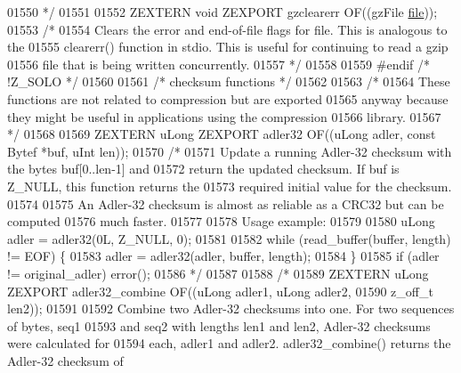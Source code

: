 \begin{DoxyCode}
01550 \textcolor{comment}{*/}
01551 
01552 ZEXTERN \textcolor{keywordtype}{void} ZEXPORT gzclearerr OF((gzFile \hyperlink{structfile}{file}));
01553 \textcolor{comment}{/*}
01554 \textcolor{comment}{     Clears the error and end-of-file flags for file.  This is analogous to the}
01555 \textcolor{comment}{   clearerr() function in stdio.  This is useful for continuing to read a gzip}
01556 \textcolor{comment}{   file that is being written concurrently.}
01557 \textcolor{comment}{*/}
01558 
01559 \textcolor{preprocessor}{#endif }\textcolor{comment}{/* !Z\_SOLO */}\textcolor{preprocessor}{}
01560 
01561                         \textcolor{comment}{/* checksum functions */}
01562 
01563 \textcolor{comment}{/*}
01564 \textcolor{comment}{     These functions are not related to compression but are exported}
01565 \textcolor{comment}{   anyway because they might be useful in applications using the compression}
01566 \textcolor{comment}{   library.}
01567 \textcolor{comment}{*/}
01568 
01569 ZEXTERN uLong ZEXPORT adler32 OF((uLong adler, \textcolor{keyword}{const} Bytef *buf, uInt len));
01570 \textcolor{comment}{/*}
01571 \textcolor{comment}{     Update a running Adler-32 checksum with the bytes buf[0..len-1] and}
01572 \textcolor{comment}{   return the updated checksum.  If buf is Z\_NULL, this function returns the}
01573 \textcolor{comment}{   required initial value for the checksum.}
01574 \textcolor{comment}{}
01575 \textcolor{comment}{     An Adler-32 checksum is almost as reliable as a CRC32 but can be computed}
01576 \textcolor{comment}{   much faster.}
01577 \textcolor{comment}{}
01578 \textcolor{comment}{   Usage example:}
01579 \textcolor{comment}{}
01580 \textcolor{comment}{     uLong adler = adler32(0L, Z\_NULL, 0);}
01581 \textcolor{comment}{}
01582 \textcolor{comment}{     while (read\_buffer(buffer, length) != EOF) \{}
01583 \textcolor{comment}{       adler = adler32(adler, buffer, length);}
01584 \textcolor{comment}{     \}}
01585 \textcolor{comment}{     if (adler != original\_adler) error();}
01586 \textcolor{comment}{*/}
01587 
01588 \textcolor{comment}{/*}
01589 \textcolor{comment}{ZEXTERN uLong ZEXPORT adler32\_combine OF((uLong adler1, uLong adler2,}
01590 \textcolor{comment}{                                          z\_off\_t len2));}
01591 \textcolor{comment}{}
01592 \textcolor{comment}{     Combine two Adler-32 checksums into one.  For two sequences of bytes, seq1}
01593 \textcolor{comment}{   and seq2 with lengths len1 and len2, Adler-32 checksums were calculated for}
01594 \textcolor{comment}{   each, adler1 and adler2.  adler32\_combine() returns the Adler-32 checksum of}

\end{DoxyCode}
